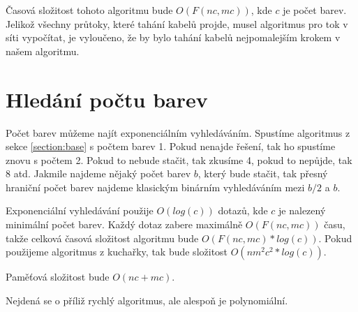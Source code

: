 \documentclass{article}
\begin{document}
Časová složitost tohoto algoritmu bude \(O(F(nc, mc))\), kde \(c\) je počet barev. Jelikož všechny průtoky, které tahání kabelů projde, musel algoritmus pro tok v síti vypočítat, je vyloučeno, že by bylo tahání kabelů nejpomalejším krokem v našem algoritmu.

\section{Hledání počtu barev}

Počet barev můžeme najít exponenciálním vyhledáváním. Spustíme algoritmus z sekce \ref{section:base} s počtem barev 1. Pokud nenajde řešení, tak ho spustíme znovu s počtem 2. Pokud to nebude stačit, tak zkusíme 4, pokud to nepůjde, tak 8 atd. Jakmile najdeme nějaký počet barev \(b\), který bude stačit, tak přesný hraniční počet barev najdeme klasickým binárním vyhledáváním mezi \(b/2\) a \(b\).

Exponenciální vyhledávání použije \(O(log(c))\) dotazů, kde \(c\) je nalezený minimální počet barev. Každý dotaz zabere maximálně \(O(F(nc, mc))\) času, takže celková časová složitost algoritmu bude \(O(F(nc, mc)*log(c))\). Pokud použijeme algoritmus z kuchařky, tak bude složitost \(O(nm^2c^2*log(c))\).

Paměťová složitost bude \(O(nc+mc)\).

Nejdená se o příliž rychlý algoritmus, ale alespoň je polynomiální.
\end{document}
